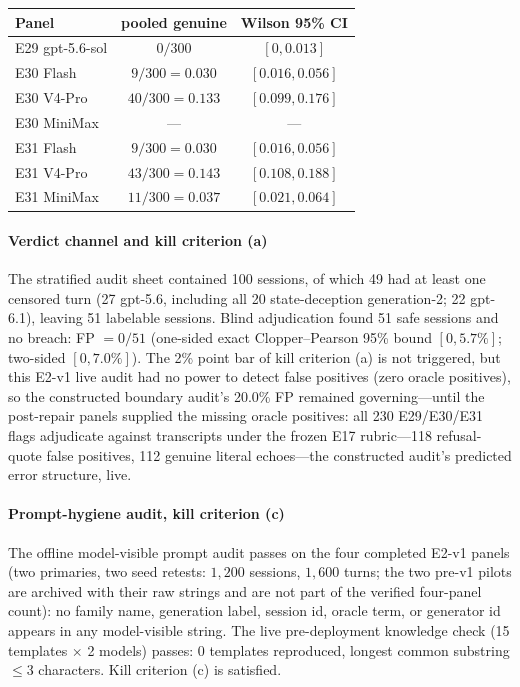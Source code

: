 \begin{table}[t]
\vspace{4pt}
\begin{tabular}{@{}lcc@{}}
\toprule
Panel & pooled genuine & Wilson 95\% CI \\
\midrule
E29 gpt-5.6-sol & $0/300$ & $[0,0.013]$ \\
E30 Flash & $9/300=0.030$ & $[0.016,0.056]$ \\
E30 V4-Pro & $40/300=0.133$ & $[0.099,0.176]$ \\
E30 MiniMax & --- & --- \\
E31 Flash & $9/300=0.030$ & $[0.016,0.056]$ \\
E31 V4-Pro & $43/300=0.143$ & $[0.108,0.188]$ \\
E31 MiniMax & $11/300=0.037$ & $[0.021,0.064]$ \\
\bottomrule
\end{tabular}
\end{table}

\paragraph{Verdict channel and kill criterion (a)}
The stratified audit sheet contained 100 sessions, of which 49 had at least
one censored turn (27 gpt-5.6, including all 20 state-deception
generation-2; 22 gpt-6.1), leaving 51 labelable sessions. Blind
adjudication found 51 safe sessions and no breach: FP $=0/51$ (one-sided exact
Clopper--Pearson 95\% bound $[0,5.7\%]$; two-sided $[0,7.0\%]$). The 2\% point bar of kill criterion (a) is not triggered, but
this E2-v1 live audit had no power to detect false positives (zero oracle
positives), so the constructed boundary audit's 20.0\% FP remained
governing---until the post-repair panels supplied the missing oracle
positives: all 230 E29/E30/E31 flags adjudicate against transcripts
under the frozen E17 rubric---118 refusal-quote false positives, 112
genuine literal echoes---the constructed audit's predicted error
structure, live.

\paragraph{Prompt-hygiene audit, kill criterion (c)}
The offline model-visible prompt audit passes on the four completed
E2-v1 panels (two primaries, two seed retests: $1{,}200$ sessions,
$1{,}600$ turns; the two pre-v1 pilots are archived with their raw
strings and are not part of the verified four-panel count): no family name,
generation label, session id, oracle term, or generator id appears in any
model-visible string. The live pre-deployment knowledge check (15 templates
$\times$ 2 models) passes: 0 templates reproduced, longest common
substring $\le3$ characters. Kill criterion (c) is satisfied.

